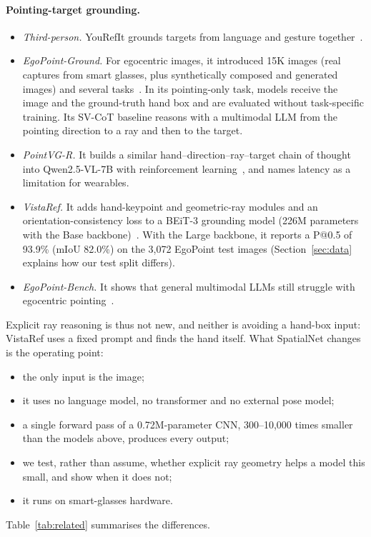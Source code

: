 \paragraph{Pointing-target grounding.}
\begin{itemize}
\item \emph{Third-person.} YouRefIt grounds targets from language and gesture together~\cite{chen2021yourefit}.
\item \emph{EgoPoint-Ground.} For egocentric images, it introduced 15K images (real captures from smart glasses, plus synthetically composed and generated images) and several tasks~\cite{egopoint}. In its pointing-only task, models receive the image and the ground-truth hand box and are evaluated without task-specific training. Its SV-CoT baseline reasons with a multimodal LLM from the pointing direction to a ray and then to the target.
\item \emph{PointVG-R.} It builds a similar hand--direction--ray--target chain of thought into Qwen2.5-VL-7B with reinforcement learning~\cite{li2026pointvgr}, and names latency as a limitation for wearables.
\item \emph{VistaRef.} It adds hand-keypoint and geometric-ray modules and an orientation-consistency loss to a BEiT-3 grounding model (226M parameters with the Base backbone)~\cite{li2026vistaref}. With the Large backbone, it reports a P@0.5 of 93.9\% (mIoU 82.0\%) on the 3,072 EgoPoint test images (Section~\ref{sec:data} explains how our test split differs).
\item \emph{EgoPoint-Bench.} It shows that general multimodal LLMs still struggle with egocentric pointing~\cite{li2026egopointbench}.
\end{itemize}
Explicit ray reasoning is thus not new, and neither is avoiding a hand-box input: VistaRef uses a fixed prompt and finds the hand itself. What SpatialNet changes is the operating point:
\begin{itemize}
\item the only input is the image;
\item it uses no language model, no transformer and no external pose model;
\item a single forward pass of a 0.72M-parameter CNN, 300--10{,}000 times smaller than the models above, produces every output;
\item we test, rather than assume, whether explicit ray geometry helps a model this small, and show when it does not;
\item it runs on smart-glasses hardware.
\end{itemize}
Table~\ref{tab:related} summarises the differences.


